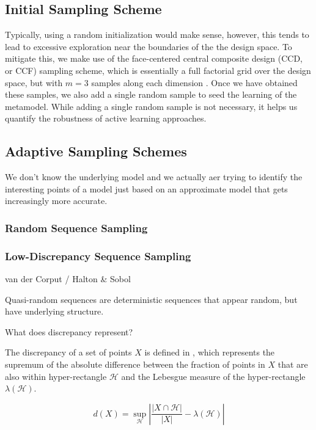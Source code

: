 \documentclass[conference]{IEEEtran}
\begin{document}
	\subsection{Initial Sampling Scheme}
	
	Typically, using a random initialization would make sense, however, this tends to lead to excessive exploration near the boundaries of the the design space. To mitigate this, we make use of the face-centered central composite design (CCD, or CCF) sampling scheme, which is essentially a full factorial grid over the design space, but with $m=3$ samples along each dimension \cite{CentralCCD}. Once we have obtained these samples, we also add a single random sample to seed the learning of the metamodel. While adding a single random sample is not necessary, it helps us quantify the robustness of active learning approaches.
	
    \subsection{Adaptive Sampling Schemes}
	
	We don't know the underlying model and we actually aer trying to identify the interesting points of a model just based on an approximate model that gets increasingly more accurate.

	
	\subsubsection{Random Sequence Sampling}
	
	\subsubsection{Low-Discrepancy Sequence Sampling}
	
	van der Corput / Halton & Sobol
	
	Quasi-random sequences are deterministic sequences that appear random, but have underlying structure. 
	
	What does discrepancy represent? \cite{kuipers1974uniform}
	
	The discrepancy of a set of points $X$ is defined in , which represents the supremum of the absolute difference between the fraction of points in $X$ that are also within hyper-rectangle $\mathcal{H}$ and the Lebesgue measure of the hyper-rectangle $\lambda(\mathcal{H})$.
	
	\begin{equation}
	    \label{eqn:discrepancy}
	    d(X) = \sup_\mathcal{H} \left| \frac{|X \cap \mathcal{H}|}{|X|} - \lambda(\mathcal{H}) \right|
	\end{equation}
\end{document}
